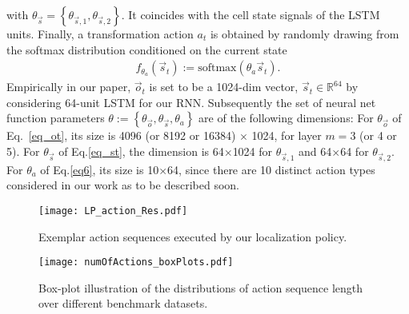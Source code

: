 \documentclass[10pt,journal,compsoc,twoside]{IEEEtran}
\begin{document}
with $\theta_{\vec{s}} = \left\{ \theta_{\vec{s},1}, \theta_{\vec{s},2} \right\}$. It coincides with the cell state signals of the LSTM units.
Finally, a transformation action $a_t$ is obtained by randomly drawing from the softmax distribution conditioned on the current state
\begin{align}
\label{eq6}
f_{\theta_a}\left( \vec{s}_t \right) := \mathrm{softmax} \left( \theta_{a} \vec{s}_{t} \right).
\end{align}
%
Empirically in our paper, $\vec{o}_t$ is set to be a 1024-dim vector, $\vec{s}_t \in \mathbb{R}^{64}$ by considering 64-unit LSTM for our RNN. Subsequently the set of neural net function parameters $\mathcal{\theta}:= \left\{ \theta_{\vec{o}}, \theta_{\vec{s}}, \theta_{a} \right\}$ are of the following dimensions: For $\theta_{\vec{o}}$ of Eq.~\eqref{eq_ot}, its size is 4096 (or 8192 or 16384) $\times$ 1024, for layer $m=$3 (or 4 or 5). For $\theta_{\vec{s}}$ of Eq.\eqref{eq_st}, the dimension is 64$\times$1024 for $\theta_{\vec{s},1}$ and 64$\times$64 for $\theta_{\vec{s},2}$. For $\theta_a$ of Eq.\eqref{eq6}, its size is 10$\times$64, since there are 10 distinct action types considered in our work as to be described soon.



\begin{figure}[!t]
\centering
\texttt{[image: LP\_action\_Res.pdf]}\\
\caption{Exemplar action sequences executed by our localization policy.}
\label{fig_67}
\end{figure}

\begin{figure}[!t]
\centering
\texttt{[image: numOfActions\_boxPlots.pdf]}\\
\caption{Box-plot illustration of the distributions of action sequence length over different benchmark datasets.}
\label{fig_numOfActions}
\end{figure}
\end{document}
